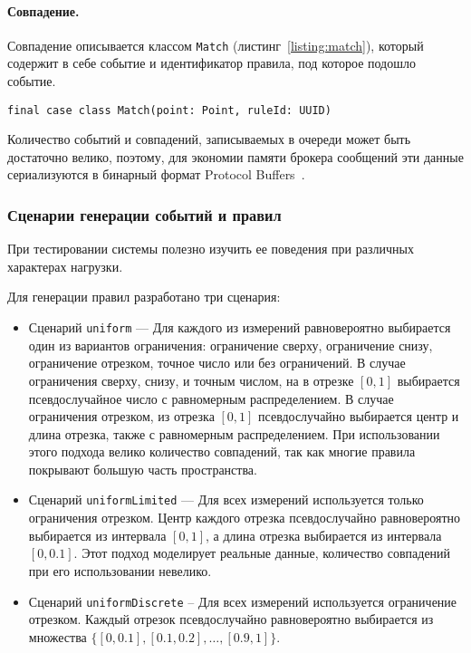 \documentclass[14pt]{article}
\begin{document}
\paragraph{Совпадение.} Совпадение описывается классом \verb|Match| (листинг~\ref{listing:match}), который содержит в себе событие и идентификатор правила, под которое подошло событие.
\begin{lstlisting}[style=scalaStyle,caption={Класс, описывающий совпадение.},label={listing:match},captionpos=b, float]
final case class Match(point: Point, ruleId: UUID)
\end{lstlisting}

Количество событий и совпадений, записываемых в очереди может быть достаточно велико, поэтому, для экономии памяти брокера сообщений эти данные сериализуются в бинарный формат Protocol Buffers~\cite{protobuf}.

\subsubsection{Сценарии генерации событий и правил}
При тестировании системы полезно изучить ее поведения при различных характерах нагрузки.

Для генерации правил разработано три сценария:
\begin{itemize}
    \item Сценарий \verb|uniform| --- Для каждого из измерений равновероятно выбирается один из вариантов ограничения: ограничение сверху, ограничение снизу, ограничение отрезком, точное число или без ограничений. В случае ограничения сверху, снизу, и точным числом, на в отрезке $[0, 1]$ выбирается псевдослучайное число с равномерным распределением. В случае ограничения отрезком, из отрезка $[0, 1]$ псевдослучайно выбирается центр и длина отрезка, также с равномерным распределением. При использовании этого подхода велико количество совпадений, так как многие правила покрывают большую часть пространства.

    \item Сценарий \verb|uniformLimited| --- Для всех измерений используется только ограничения отрезком. Центр каждого отрезка псевдослучайно равновероятно выбирается из интервала $[0, 1]$, а длина отрезка выбирается из интервала $[0, 0.1]$. Этот подход моделирует реальные данные, количество совпадений при его использовании невелико.

    \item Сценарий \verb|uniformDiscrete| -- Для всех измерений используется ограничение отрезком. Каждый отрезок псевдослучайно равновероятно выбирается из множества $\{[0, 0.1], [0.1, 0.2],\dots,[0.9, 1]\}$.
\end{itemize}
\end{document}
